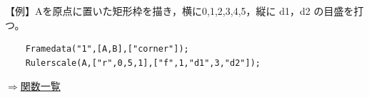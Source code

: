 \documentclass[papersize,a4paper,12pt,uplatex]{jsarticle}
\begin{document}
\begin{description}
\vspace{\baselineskip}
【例】Aを原点に置いた矩形枠を描き，横に0,1,2,3,4,5，縦に d1，d2 の目盛を打つ。
\begin{verbatim}
    Framedata("1",[A,B],["corner"]);
    Rulerscale(A,["r",0,5,1],["f",1,"d1",3,"d2"]);
\end{verbatim}  
      \begin{center}  \end{center}
\vspace{\baselineskip}
\begin{flushright}  \hyperlink{functionlist}{$\Rightarrow$関数一覧}\end{flushright}

\end{description}
\newpage
\end{document}
